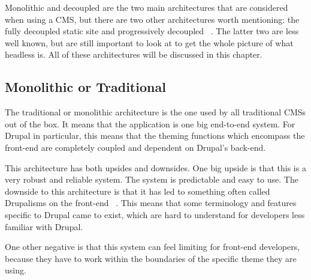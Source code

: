 Monolithic and decoupled are the two main architectures that are considered when using a CMS, but there are two other architectures worth mentioning: the fully decoupled static site and progressively decoupled ~\autocite{Dropsolid2021}. The latter two are less well known, but are still important to look at to get the whole picture of what headless is. All of these architectures will be discussed in this chapter.


\subsection{Monolithic or Traditional}
The traditional or monolithic architecture is the one used by all traditional CMSs out of the box. It means that the application is one big end-to-end system. For Drupal in particular, this means that the theming functions which encompass the front-end are completely coupled and dependent on Drupal's back-end.

This architecture has both upsides and downsides. One big upside is that this is a very robust and reliable system. The system is predictable and easy to use. The downside to this architecture is that it has led to something often called Drupalisms on the front-end ~\autocite{So2018}. This means that some terminology and features specific to Drupal came to exist, which are hard to understand for developers less familiar with Drupal. 

One other negative is that this system can feel limiting for front-end developers, because they have to work within the boundaries of the specific theme they are using.

